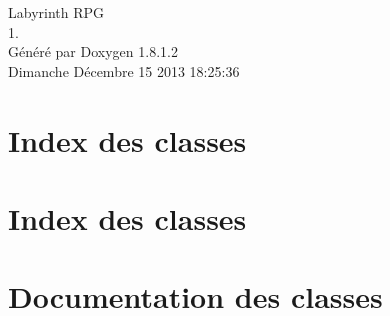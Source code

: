 \documentclass{book}
\begin{document}
\hypersetup{pageanchor=false,citecolor=blue}
\begin{titlepage}
\vspace*{7cm}
\begin{center}
{\Large Labyrinth R\-P\-G \\[1ex]\large 1. }\\
\vspace*{1cm}
{\large Généré par Doxygen 1.8.1.2}\\
\vspace*{0.5cm}
{\small Dimanche Décembre 15 2013 18:25:36}\\
\end{center}
\end{titlepage}
\clearemptydoublepage
{}
\tableofcontents
\clearemptydoublepage
{}
\hypersetup{pageanchor=true,citecolor=blue}
\chapter{Index des classes}

\chapter{Index des classes}

\chapter{Documentation des classes}






























































\printindex
\end{document}
